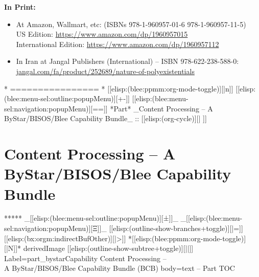 \begin{whenOrg}
\begin{frame}[fragile,plain,label=obtainingPolyBook]
    \begin{center}
      \colorbox{blue!60}{\color{white} \textbf{In Print:}}
    \end{center}

    \begin{itemize}
      \item At Amazon, Wallmart, etc: (ISBNs 978-1-960957-01-6  978-1-960957-11-5)\\
      US Edition:   \url{https://www.amazon.com/dp/1960957015}\\
      International Edition: \url{https://www.amazon.com/dp/1960957112}\\
      \item In Iran at Jangal Publishers (International) -- ISBN 978-622-238-588-0:\\
      \href{https://jangal.com/fa/product/252689/nature-of-polyexistentials}{jangal.com/fa/product/252689/nature-of-polyexistentials}
    \end{itemize}

\end{frame}


\begin{whenOrg}
*      ================
*  [[elisp:(blee:ppmm:org-mode-toggle)][|n]] [[elisp:(blee:menu-sel:outline:popupMenu)][+-]] [[elisp:(blee:menu-sel:navigation:popupMenu)][==]]  *Part*   _Content Processing -- A ByStar/BISOS/Blee Capability Bundle_ ::  [[elisp:(org-cycle)][| ]]
\end{whenOrg}

\newpage
\part{Content Processing -- A ByStar/BISOS/Blee Capability Bundle}


\begin{whenOrg}
*****  _[[elisp:(blee:menu-sel:outline:popupMenu)][±]]_ _[[elisp:(blee:menu-sel:navigation:popupMenu)][Ξ]]_ [[elisp:(outline-show-branches+toggle)][|=]] [[elisp:(bx:orgm:indirectBufOther)][|>]] *[[elisp:(blee:ppmm:org-mode-toggle)][|N]]*  derivedImage [[elisp:(outline-show-subtree+toggle)][||]] Label=part_bystarCapability Content Processing --\\ A ByStar/BISOS/Blee Capability Bundle (BCB) body=text -- Part TOC
\end{whenOrg}


\end{whenOrg}
